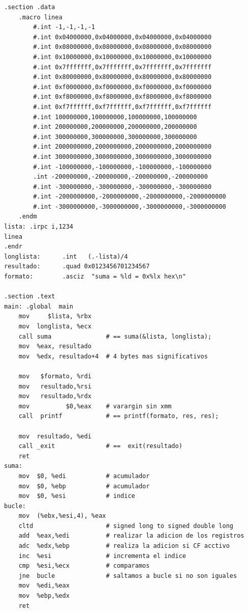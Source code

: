 	\lstset{language=[x64]Assembler}
	\begin{lstlisting}[frame=single]
.section .data
	.macro linea
		#.int -1,-1,-1,-1
		#.int 0x04000000,0x04000000,0x04000000,0x04000000
		#.int 0x08000000,0x08000000,0x08000000,0x08000000
		#.int 0x10000000,0x10000000,0x10000000,0x10000000
		#.int 0x7fffffff,0x7fffffff,0x7fffffff,0x7fffffff
		#.int 0x80000000,0x80000000,0x80000000,0x80000000
		#.int 0xf0000000,0xf0000000,0xf0000000,0xf0000000
		#.int 0xf8000000,0xf8000000,0xf8000000,0xf8000000
		#.int 0xf7ffffff,0xf7ffffff,0xf7ffffff,0xf7ffffff
		#.int 100000000,100000000,100000000,100000000
		#.int 200000000,200000000,200000000,200000000
		#.int 300000000,300000000,300000000,300000000
		#.int 2000000000,2000000000,2000000000,2000000000
		#.int 3000000000,3000000000,3000000000,3000000000
		#.int -100000000,-100000000,-100000000,-100000000
		.int -200000000,-200000000,-200000000,-200000000
		#.int -300000000,-300000000,-300000000,-300000000
		#.int -2000000000,-2000000000,-2000000000,-2000000000
		#.int -3000000000,-3000000000,-3000000000,-3000000000
	.endm
lista: .irpc i,1234
linea
.endr
longlista:      .int   (.-lista)/4
resultado:      .quad 0x0123456701234567
formato:        .asciz  "suma = %ld = 0x%lx hex\n"

.section .text
main: .global  main
	mov     $lista, %rbx
	mov  longlista, %ecx
	call suma               # == suma(&lista, longlista);
	mov  %eax, resultado
	mov  %edx, resultado+4  # 4 bytes mas significativos
	
	mov   $formato, %rdi
	mov   resultado,%rsi
	mov   resultado,%rdx
	mov          $0,%eax    # varargin sin xmm
	call  printf            # == printf(formato, res, res);
	
	mov  resultado, %edi
	call _exit              # ==  exit(resultado)
	ret
suma:
	mov  $0, %edi           # acumulador
	mov  $0, %ebp           # acumulador
	mov  $0, %esi           # indice
bucle:
	mov  (%ebx,%esi,4), %eax
	cltd                    # signed long to signed double long
	add  %eax,%edi          # realizar la adicion de los registros
	adc  %edx,%ebp          # realiza la adicion si CF acctivo
	inc  %esi               # incrementa el indice
	cmp  %esi,%ecx          # comparamos
	jne  bucle              # saltamos a bucle si no son iguales
	mov  %edi,%eax
	mov  %ebp,%edx
	ret
	\end{lstlisting}
		
	
